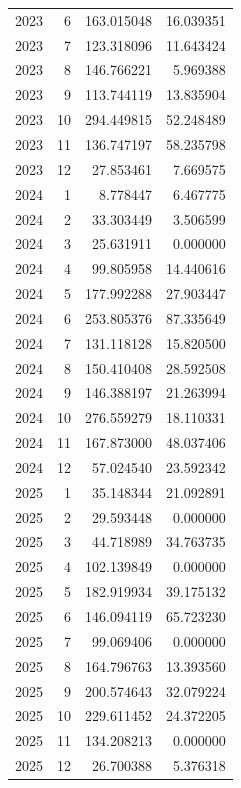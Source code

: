 \begin{tabular}{rrrr}
2023 & 6 & 163.015048 & 16.039351 \\
2023 & 7 & 123.318096 & 11.643424 \\
2023 & 8 & 146.766221 & 5.969388 \\
2023 & 9 & 113.744119 & 13.835904 \\
2023 & 10 & 294.449815 & 52.248489 \\
2023 & 11 & 136.747197 & 58.235798 \\
2023 & 12 & 27.853461 & 7.669575 \\
2024 & 1 & 8.778447 & 6.467775 \\
2024 & 2 & 33.303449 & 3.506599 \\
2024 & 3 & 25.631911 & 0.000000 \\
2024 & 4 & 99.805958 & 14.440616 \\
2024 & 5 & 177.992288 & 27.903447 \\
2024 & 6 & 253.805376 & 87.335649 \\
2024 & 7 & 131.118128 & 15.820500 \\
2024 & 8 & 150.410408 & 28.592508 \\
2024 & 9 & 146.388197 & 21.263994 \\
2024 & 10 & 276.559279 & 18.110331 \\
2024 & 11 & 167.873000 & 48.037406 \\
2024 & 12 & 57.024540 & 23.592342 \\
2025 & 1 & 35.148344 & 21.092891 \\
2025 & 2 & 29.593448 & 0.000000 \\
2025 & 3 & 44.718989 & 34.763735 \\
2025 & 4 & 102.139849 & 0.000000 \\
2025 & 5 & 182.919934 & 39.175132 \\
2025 & 6 & 146.094119 & 65.723230 \\
2025 & 7 & 99.069406 & 0.000000 \\
2025 & 8 & 164.796763 & 13.393560 \\
2025 & 9 & 200.574643 & 32.079224 \\
2025 & 10 & 229.611452 & 24.372205 \\
2025 & 11 & 134.208213 & 0.000000 \\
2025 & 12 & 26.700388 & 5.376318 \\
\bottomrule
\end{tabular}
